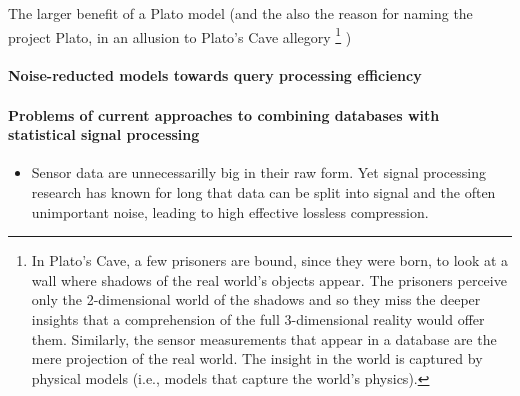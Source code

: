 The larger benefit of a Plato model (and the also the reason for naming the project Plato, in an allusion to Plato's Cave allegory%
\footnote{In Plato's Cave, a few prisoners are bound, since they were born, to look at a wall where shadows of the real world's objects appear. The prisoners perceive only the 2-dimensional world of the shadows and so they miss the deeper insights that a comprehension of the full 3-dimensional reality would offer them. Similarly, the sensor measurements that appear in a database are the mere projection of the real world. The insight in the world is captured by physical models (i.e., models that capture the world's physics). 
}
)

\paragraph{Noise-reducted models towards query processing efficiency}





\paragraph{Problems of current approaches to combining databases with statistical signal processing}
\begin{itemize}
%
\item Sensor data are unnecessarilly big in their raw form. Yet signal processing research has known for long that data can be split into signal and the often unimportant noise, leading to high effective lossless compression. 
%
\end{itemize}

